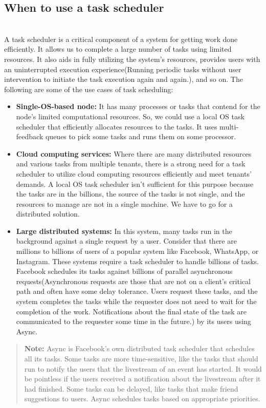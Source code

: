 \subsection{When to use a task scheduler}\label{B4RR4tT_obabcovGm18Nc}
\\
A task scheduler is a critical component of a system for getting work done efficiently. It allows us to complete a large number of tasks using limited resources. It also aids in fully utilizing the system's resources, provides users with an uninterrupted execution experience(Running periodic tasks without user intervention to initiate the task execution again and again.), and so on. The following are some of the use cases of task scheduling:

\begin{itemize}
\item
\protect{}\label{kcxYpOO9hEzD2wxQnmlcH}
\textbf{Single-OS-based node:} It has many processes or tasks that contend for the node's limited computational resources. So, we could use a local OS task scheduler that efficiently allocates resources to the tasks. It uses multi-feedback queues to pick some tasks and runs them on some processor.
\item
\protect{}\label{wfsyejuy65KKZ0j71bmhX}
\textbf{Cloud computing services:} Where there are many distributed resources and various tasks from multiple tenants, there is a strong need for a task scheduler to utilize cloud computing resources efficiently and meet tenants' demands. A local OS task scheduler isn't sufficient for this purpose because the tasks are in the billions, the source of the tasks is not single, and the resources to manage are not in a single machine. We have to go for a distributed solution.
\item
\protect{}\label{Kxqm9Z9LhYYurWO1IyOqA}
\textbf{Large distributed systems:} In this system, many tasks run in the background against a single request by a user. Consider that there are millions to billions of users of a popular system like Facebook, WhatsApp, or Instagram. These systems require a task scheduler to handle billions of tasks. Facebook schedules its tasks against billions of parallel asynchronous requests(Asynchronous requests are those that are not on a client's critical path and often have some delay tolerance. Users request these tasks, and the system completes the tasks while the requester does not need to wait for the completion of the work. Notifications about the final state of the task are communicated to the requester some time in the future.) by its users using Async.
\end{itemize}
\begin{quote}
\textbf{Note:} Async is Facebook's own distributed task scheduler that schedules all its tasks. Some tasks are more time-sensitive, like the tasks that should run to notify the users that the livestream of an event has started. It would be pointless if the users received a notification about the livestream after it had finished. Some tasks can be delayed, like tasks that make friend suggestions to users. Async schedules tasks based on appropriate priorities.
\end{quote}
